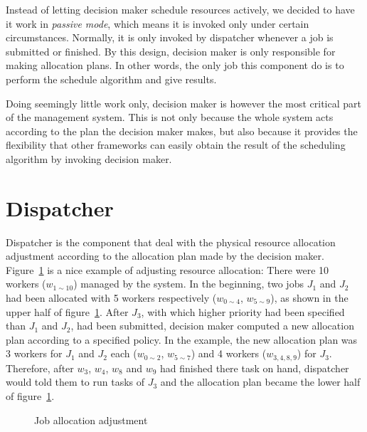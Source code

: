Instead of letting decision maker schedule resources actively, we
decided to have it work in \emph{passive mode}, which means it is
invoked only under certain circumstances.
Normally, it is only invoked by dispatcher whenever a job is submitted
or finished.
By this design, decision maker is only responsible for making allocation
plans.
In other words, the only job this component do is to perform the
schedule algorithm and give results.


Doing seemingly little work only, decision maker is however the most
critical part of the management system.
This is not only because the whole system acts according to the plan the
decision maker makes, but also because it provides the flexibility that
other frameworks can easily obtain the result of the scheduling
algorithm by invoking decision maker.

\section{Dispatcher}

Dispatcher is the component that deal with the physical resource
allocation adjustment according to the allocation plan made by the
decision maker.
Figure~\ref{fig:allocation-adjustment} is a nice example of adjusting
resource allocation: There were 10 workers ($w_{1\sim10}$) managed by
the system.
In the beginning, two jobs $J_1$ and $J_2$ had been allocated with 5
workers respectively ($w_{0\sim4}$, $w_{5\sim9}$), as shown in the upper
half of figure~\ref{fig:allocation-adjustment}.
After $J_3$, with which higher priority had been specified than $J_1$
and $J_2$, had been submitted, decision maker computed a new allocation
plan according to a specified policy.
In the example, the new allocation plan was 3 workers for $J_1$ and
$J_2$ each ($w_{0\sim2}$, $w_{5\sim7}$) and 4 workers ($w_{3,4,8,9}$)
for $J_3$.
Therefore, after $w_3$, $w_4$, $w_8$ and $ w_9$ had finished there task
on hand, dispatcher would told them to run tasks of $J_3$ and the
allocation plan became the lower half of
figure~\ref{fig:allocation-adjustment}.

\begin{figure}
  \centering
  
  \caption{Job allocation adjustment}
  \label{fig:allocation-adjustment}
\end{figure}
